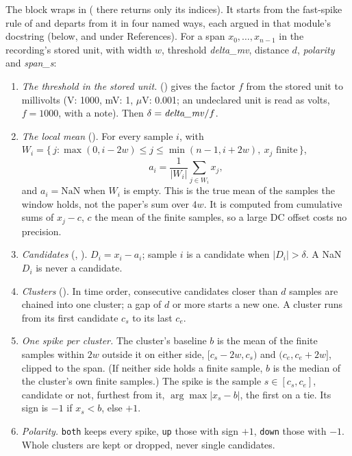 The block wraps  in 
( there returns only its indices). It starts from the fast-spike
rule of \citet{adamatzky2023multiscalar} and departs from it in four named ways, each argued
in that module's docstring (below, and under References). For a span $x_0,\dots,x_{n-1}$ in
the recording's stored unit, with width $w$, threshold \emph{delta\_mv}, distance $d$,
\emph{polarity} and \emph{span\_s}:
\begin{enumerate}
\item \emph{The threshold in the stored unit.}  ()
  gives the factor $f$ from the stored unit to millivolts (V: 1000, mV: 1, $\mu$V: 0.001; an
  undeclared unit is read as volts, $f = 1000$, with a note). Then
  $\delta = \text{\emph{delta\_mv}} / f$.
\item \emph{The local mean} (). For every sample $i$, with
  $W_i = \{\, j : \max(0, i-2w) \le j \le \min(n-1, i+2w),\ x_j \text{ finite} \,\}$,
  \[ a_i = \frac{1}{|W_i|}\sum_{j \in W_i} x_j , \]
  and $a_i = \mathrm{NaN}$ when $W_i$ is empty. This is the true mean of the samples the
  window holds, not the paper's sum over $4w$. It is computed from cumulative sums of
  $x_j - c$, $c$ the mean of the finite samples, so a large DC offset costs no precision.
\item \emph{Candidates} (, ). $D_i = x_i - a_i$;
  sample $i$ is a candidate when $|D_i| > \delta$. A NaN $D_i$ is never a candidate.
\item \emph{Clusters} (). In time order, consecutive candidates closer
  than $d$ samples are chained into one cluster; a gap of $d$ or more starts a new one. A
  cluster runs from its first candidate $c_s$ to its last $c_e$.
\item \emph{One spike per cluster.} The cluster's baseline $b$ is the mean of the finite
  samples within $2w$ outside it on either side, $[c_s - 2w, c_s)$ and $(c_e, c_e + 2w]$,
  clipped to the span. (If neither side holds a finite sample, $b$ is the median of the
  cluster's own finite samples.) The spike is the sample $s \in [c_s, c_e]$, candidate or
  not, furthest from it, $\arg\max |x_s - b|$, the first on a tie. Its sign is $-1$ if
  $x_s < b$, else $+1$.
\item \emph{Polarity.} \texttt{both} keeps every spike, \texttt{up} those with sign $+1$,
  \texttt{down} those with $-1$. Whole clusters are kept or dropped, never single candidates.
\end{enumerate}

